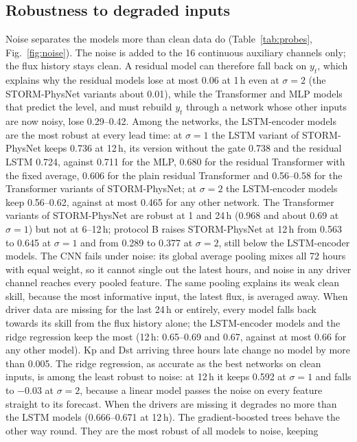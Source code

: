 \documentclass[a4paper,fleqn]{cas-dc}
\begin{document}
\subsection{Robustness to degraded inputs}
\label{sec:robust}
Noise separates the models more than clean data do (Table~\ref{tab:probes}, Fig.~\ref{fig:noise}). The noise
is added to the 16 continuous auxiliary channels only; the flux history stays clean. A residual model can therefore
fall back on \(y_t\), which explains why the residual models lose at most 0.06 at 1\,h even at \(\sigma=2\) (the STORM-PhysNet
variants about 0.01), while the Transformer and MLP models that predict the level, and must rebuild \(y_t\)
through a network whose other inputs are now noisy, lose 0.29--0.42. Among the networks, the LSTM-encoder
models are the most robust at every lead time: at \(\sigma=1\) the LSTM variant of STORM-PhysNet keeps 0.736 at
12\,h, its version without the gate 0.738 and the residual LSTM 0.724, against 0.711 for the MLP, 0.680 for the residual Transformer with the fixed average, 0.606 for the plain
residual Transformer and 0.56--0.58 for the Transformer variants of STORM-PhysNet; at \(\sigma=2\) the LSTM-encoder models keep
0.56--0.62, against at most 0.465 for any other network. The Transformer variants of STORM-PhysNet are robust at 1 and
24\,h (0.968 and about 0.69 at \(\sigma=1\)) but not at 6--12\,h; protocol B raises STORM-PhysNet at 12\,h from
0.563 to 0.645 at \(\sigma=1\) and from 0.289 to 0.377 at \(\sigma=2\), still below the LSTM-encoder models. The CNN fails under noise: its global average pooling mixes all 72 hours with equal
weight, so it cannot single out the latest hours, and noise in any driver channel reaches every pooled
feature. The same pooling explains its weak clean skill, because the most informative input, the latest flux,
is averaged away. When driver data are
missing for the last 24\,h or entirely, every model falls back towards its skill from the flux history alone;
the LSTM-encoder models and the ridge regression keep the most (12\,h: 0.65--0.69 and 0.67, against at most 0.66
for any other model).
Kp and Dst arriving three hours late change no model by more than 0.005. The ridge regression, as accurate as the
best networks on clean inputs, is among the least robust to noise: at 12\,h it keeps 0.592 at \(\sigma=1\) and
falls to \(-0.03\) at \(\sigma=2\), because a linear model passes the noise on every feature straight to its
forecast. When the drivers are missing it degrades no more than the LSTM models (0.666--0.671 at 12\,h).
The gradient-boosted trees behave the other way round. They are the most robust of all models to noise, keeping
\end{document}
